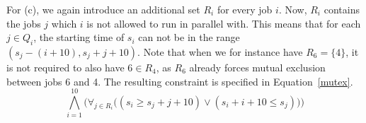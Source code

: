 For (c), we again introduce an additional set $R_i$ for every job $i$. Now, $R_i$ contains the jobs $j$ which $i$ is not allowed to run in parallel with. This means that for each $j \in Q_i$, the starting time of $s_i$ can not be in the range $(s_j - (i + 10), s_j + j + 10)$. Note that when we for instance have $R_6 = \{4\}$, it is not required to also have $6 \in R_4$, as $R_6$ already forces mutual exclusion between jobs 6 and 4. The resulting constraint is specified in Equation~\ref{mutex}.
\begin{equation}
    \label{mutex}
    \bigwedge^{10}_{i=1}\bigg(\forall_{j \in R_i}\big((s_i \geq s_j + j + 10) \vee (s_i + i + 10 \leq s_j)\big)\bigg)
\end{equation}